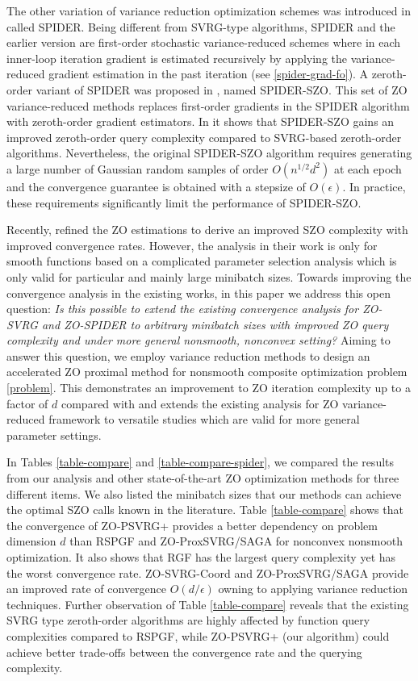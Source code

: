 \documentclass[iicol,sn-basic]{sn-jnl}
\theoremstyle{thmstyleone}%
\theoremstyle{thmstyletwo}%
\theoremstyle{thmstylethree}%
\begin{document}
The other variation of variance reduction optimization schemes was introduced in \cite{fang2018spider} called SPIDER. Being different from SVRG-type algorithms, SPIDER \cite{fang2018spider} and the earlier version \cite{nguyen2017sarah,nguyen2017stochastic} are first-order stochastic variance-reduced schemes where in each inner-loop iteration gradient is estimated recursively by applying the variance-reduced gradient estimation in the past iteration (see \eqref{spider-grad-fo}). A zeroth-order variant of SPIDER was proposed in \cite{fang2018spider}, named SPIDER-SZO. This set of ZO variance-reduced methods replaces first-order gradients in the SPIDER algorithm with zeroth-order gradient estimators. In \cite{fang2018spider} it shows that SPIDER-SZO gains an improved zeroth-order query complexity compared to SVRG-based zeroth-order algorithms. Nevertheless, the original SPIDER-SZO algorithm requires generating a large number of Gaussian random samples of order $O(n^{1/2}d^2)$ at each epoch and the convergence guarantee is obtained with a stepsize of $O(\epsilon)$. In practice, these requirements significantly limit the performance of SPIDER-SZO.


Recently, \cite{ji2019improved} refined the ZO estimations to derive an improved SZO complexity with improved convergence rates. However, the analysis in their work is only for smooth functions based on a complicated parameter selection analysis which is only valid for particular and mainly large minibatch sizes. Towards improving the convergence analysis in the existing works, in this paper we address this open question: {\it Is this possible to extend the existing convergence analysis for ZO-SVRG and ZO-SPIDER to arbitrary minibatch sizes with improved ZO query complexity and under more general nonsmooth, nonconvex setting?} Aiming to answer this question, we employ variance reduction methods to design an accelerated ZO proximal method for nonsmooth composite optimization problem \eqref{problem}. This demonstrates an improvement to ZO iteration complexity up to a factor of ${d}$ compared with \cite{huang2019faster} and extends the existing analysis for ZO variance-reduced framework to versatile studies which are valid for more general parameter settings. 

In Tables \ref{table-compare} and \ref{table-compare-spider}, we compared the results from our analysis and other state-of-the-art ZO optimization methods for three different items. We also listed the minibatch sizes that our methods can achieve the optimal SZO calls known in the literature. Table \ref{table-compare} shows that the convergence of ZO-PSVRG+
provides a better dependency on problem dimension $d$ than RSPGF and ZO-ProxSVRG/SAGA for nonconvex nonsmooth optimization. It also shows that RGF has the largest query complexity yet has the worst convergence rate. ZO-SVRG-Coord and ZO-ProxSVRG/SAGA provide an improved rate of convergence $O(d/\epsilon )$ owning to applying variance reduction techniques. Further observation of Table \ref{table-compare} reveals that the existing SVRG type zeroth-order algorithms are highly affected by function query complexities compared to RSPGF, while ZO-PSVRG+ (our algorithm) could achieve better trade-offs between the convergence rate and the querying complexity. 
\end{document}
